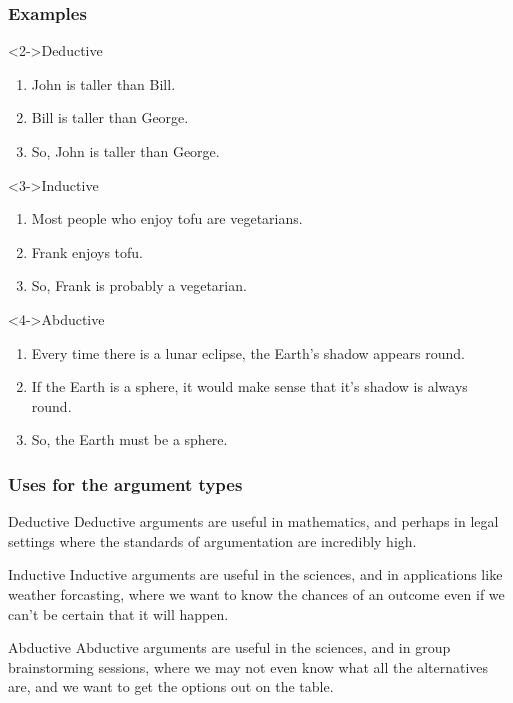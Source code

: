 \documentclass[10pt,letterpaper,xcolor=dvipsnames,handout]{beamer}
\begin{document}
\begin{frame}
\frametitle{Examples}
\small

\begin{block}<2->{Deductive}
  \begin{enumerate}
    \item John is taller than Bill.
    \item Bill is taller than George.
    \item So, John is taller than George.
  \end{enumerate}
\end{block}

\begin{block}<3->{Inductive}
  \begin{enumerate}
    \item Most people who enjoy tofu are vegetarians.
    \item Frank enjoys tofu.
    \item So, Frank is probably a vegetarian.
  \end{enumerate}
\end{block}

\begin{block}<4->{Abductive}
  \begin{enumerate}
    \item Every time there is a lunar eclipse, the Earth's shadow appears round.
    \item If the Earth is a sphere, it would make sense that it's shadow is always round.
    \item So, the Earth must be a sphere.
  \end{enumerate}
\end{block}

\end{frame}

\begin{frame}
\frametitle{Uses for the argument types}

\begin{block}{Deductive}
Deductive arguments are useful in mathematics, and perhaps in legal settings where the standards of argumentation are incredibly high.
\end{block}

\begin{block}{Inductive}
Inductive arguments are useful in the sciences, and in applications like weather forcasting, where we want to know the chances of an outcome even if we can't be certain that it will happen.
\end{block}

\begin{block}{Abductive}
Abductive arguments are useful in the sciences, and in group brainstorming sessions, where we may not even know what all the alternatives are, and we want to get the options out on the table.
\end{block}

\end{frame}
\end{document}
